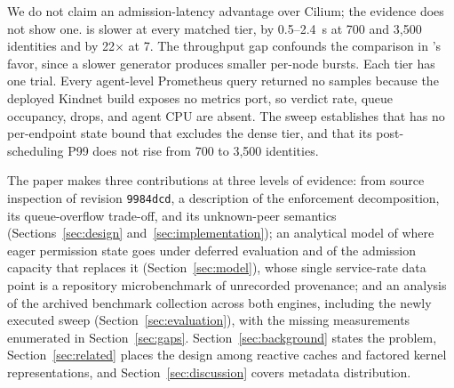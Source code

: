 We do not claim an admission-latency advantage over Cilium; the evidence
does not show one. \sys{} is slower at every matched tier, by 0.5--2.4~s
at 700 and 3,500 identities and by 22$\times$ at 7. The throughput gap
confounds the comparison in \sys{}'s favor, since a slower generator
produces smaller per-node bursts. Each tier has one trial. Every
agent-level Prometheus query returned no samples because the deployed
Kindnet build exposes no metrics port, so verdict rate, queue occupancy,
drops, and agent CPU are absent. The sweep establishes that \sys{} has no
per-endpoint state bound that excludes the dense tier, and that its
post-scheduling P99 does not rise from 700 to 3,500 identities.

The paper makes three contributions at three levels of evidence: from
source inspection of revision \texttt{9984dcd}, a description of the
enforcement decomposition, its queue-overflow trade-off, and its
unknown-peer semantics (Sections~\ref{sec:design}
and~\ref{sec:implementation}); an analytical model of where eager
permission state goes under deferred evaluation and of the admission
capacity that replaces it (Section~\ref{sec:model}), whose single
service-rate data point is a repository microbenchmark of unrecorded
provenance; and an analysis of the archived benchmark collection across
both engines, including the newly executed \sys{} sweep
(Section~\ref{sec:evaluation}), with the missing measurements enumerated
in Section~\ref{sec:gaps}. Section~\ref{sec:background} states the
problem, Section~\ref{sec:related} places the design among reactive
caches and factored kernel representations, and
Section~\ref{sec:discussion} covers metadata distribution.
